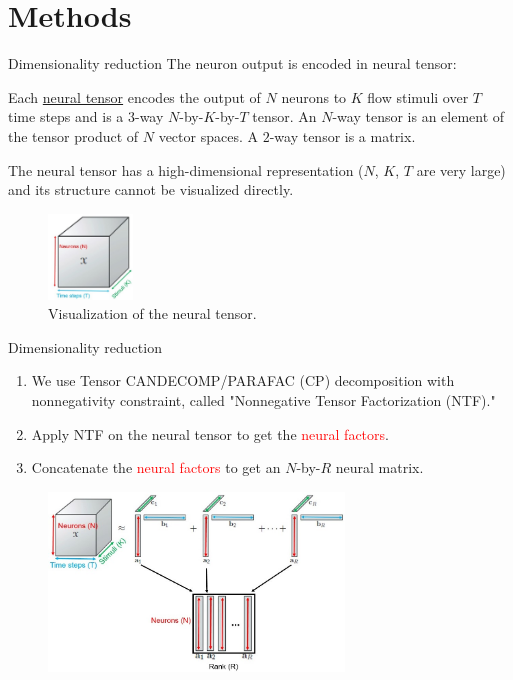 \documentclass[xcolor={dvipsnames,svgnames}]{beamer}
\begin{document}
\section[Methods]{Methods}
\begin{frame}{Dimensionality reduction}
The neuron output is encoded in neural tensor:
\begin{defn}
    Each \underline{neural tensor} encodes the output of $N$ neurons to $K$ flow stimuli over $T$ time steps and is a $3$-way $N$-by-$K$-by-$T$ tensor. An $N$-way tensor is an element of the tensor product of $N$ vector spaces. A $2$-way tensor is a matrix.
\end{defn}
The neural tensor has a high-dimensional representation ($N$, $K$, $T$ are very large) and its structure cannot be visualized directly. 

    \begin{figure}[H]
        \centering
            \includegraphics[width=0.2\textwidth]{figures/linear/neural-tensor.jpg}
            \caption{Visualization of the neural tensor.}
        \end{figure} 
\end{frame}

\begin{frame}{Dimensionality reduction}

\begin{enumerate}
    \item We use Tensor CANDECOMP/PARAFAC (CP) decomposition with nonnegativity constraint, called "Nonnegative Tensor Factorization (NTF)."
    \item Apply NTF on the neural tensor to get the \textcolor{red}{neural factors}.
    \item Concatenate the \textcolor{red}{neural factors} to get an $N$-by-$R$ neural matrix.
\end{enumerate}
    \begin{figure}[H]
        \centering
            \includegraphics[width=0.7\textwidth]{figures/linear/cp-decomp-marked.jpg}
        \end{figure} 
\end{frame}
\end{document}
